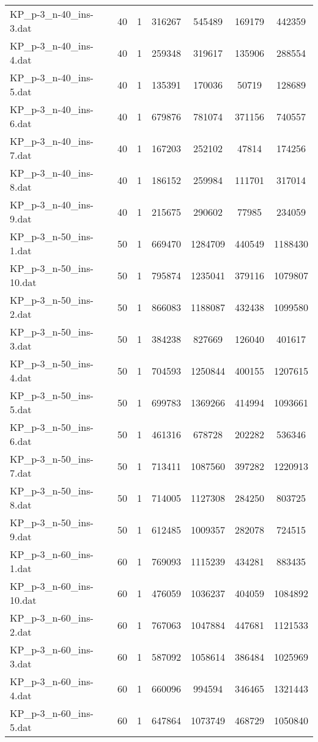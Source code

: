 \begin{table}[!ht]
\begin{tabular}{lcccccc}
KP\_p-3\_n-40\_ins-3.dat & 40 & 1 & 316267 & 545489 & 169179 & 442359 \\
KP\_p-3\_n-40\_ins-4.dat & 40 & 1 & 259348 & 319617 & 135906 & 288554 \\
KP\_p-3\_n-40\_ins-5.dat & 40 & 1 & 135391 & 170036 & 50719 & 128689 \\
KP\_p-3\_n-40\_ins-6.dat & 40 & 1 & 679876 & 781074 & 371156 & 740557 \\
KP\_p-3\_n-40\_ins-7.dat & 40 & 1 & 167203 & 252102 & 47814 & 174256 \\
KP\_p-3\_n-40\_ins-8.dat & 40 & 1 & 186152 & 259984 & 111701 & 317014 \\
KP\_p-3\_n-40\_ins-9.dat & 40 & 1 & 215675 & 290602 & 77985 & 234059 \\
KP\_p-3\_n-50\_ins-1.dat & 50 & 1 & 669470 & 1284709 & 440549 & 1188430 \\
KP\_p-3\_n-50\_ins-10.dat & 50 & 1 & 795874 & 1235041 & 379116 & 1079807 \\
KP\_p-3\_n-50\_ins-2.dat & 50 & 1 & 866083 & 1188087 & 432438 & 1099580 \\
KP\_p-3\_n-50\_ins-3.dat & 50 & 1 & 384238 & 827669 & 126040 & 401617 \\
KP\_p-3\_n-50\_ins-4.dat & 50 & 1 & 704593 & 1250844 & 400155 & 1207615 \\
KP\_p-3\_n-50\_ins-5.dat & 50 & 1 & 699783 & 1369266 & 414994 & 1093661 \\
KP\_p-3\_n-50\_ins-6.dat & 50 & 1 & 461316 & 678728 & 202282 & 536346 \\
KP\_p-3\_n-50\_ins-7.dat & 50 & 1 & 713411 & 1087560 & 397282 & 1220913 \\
KP\_p-3\_n-50\_ins-8.dat & 50 & 1 & 714005 & 1127308 & 284250 & 803725 \\
KP\_p-3\_n-50\_ins-9.dat & 50 & 1 & 612485 & 1009357 & 282078 & 724515 \\
KP\_p-3\_n-60\_ins-1.dat & 60 & 1 & 769093 & 1115239 & 434281 & 883435 \\
KP\_p-3\_n-60\_ins-10.dat & 60 & 1 & 476059 & 1036237 & 404059 & 1084892 \\
KP\_p-3\_n-60\_ins-2.dat & 60 & 1 & 767063 & 1047884 & 447681 & 1121533 \\
KP\_p-3\_n-60\_ins-3.dat & 60 & 1 & 587092 & 1058614 & 386484 & 1025969 \\
KP\_p-3\_n-60\_ins-4.dat & 60 & 1 & 660096 & 994594 & 346465 & 1321443 \\
KP\_p-3\_n-60\_ins-5.dat & 60 & 1 & 647864 & 1073749 & 468729 & 1050840 \\

\end{tabular}
\end{table}
